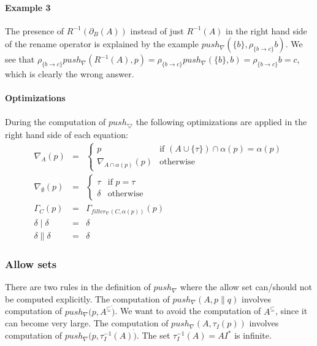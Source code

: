 \documentclass{article}
\begin{document}
\paragraph{Example 3}

The presence of $R^{-1}(\partial _{B}(A))$ instead of just $R^{-1}(A)$ in
the right hand side of the rename operator is explained by the example $%
push_{\nabla }(\{b\},\rho _{\{b\rightarrow c\}}b)$. We see that $\rho
_{\{b\rightarrow c\}}push_{\nabla }(R^{-1}(A),p)=\rho _{\{b\rightarrow
c\}}push_{\nabla }(\{b\},b)=\rho _{\{b\rightarrow c\}}b=c$, which is clearly
the wrong answer.

\paragraph{Optimizations}

During the computation of $push_{\bigtriangledown }$ the following
optimizations are applied in the right hand side of each equation:%
\[
\begin{array}{lll}
\nabla _{A}(p) & = & \left\{ 
\begin{array}{ll}
p & \text{if }(A\cup \{\tau \})\cap \alpha (p)=\alpha (p) \\ 
\nabla _{A\cap \alpha (p)}(p) & \text{otherwise}%
\end{array}%
\right. \\ 
\nabla _{\emptyset }(p) & = & \left\{ 
\begin{array}{ll}
\tau & \text{if }p=\tau \\ 
\delta & \text{otherwise}%
\end{array}%
\right. \\ 
\Gamma _{C}(p) & = & \Gamma _{filter_{\nabla }(C,\alpha (p))}(p) \\ 
\delta \mid \delta & = & \delta \\ 
\delta \parallel \delta & = & \delta%
\end{array}%
\]

\subsubsection{Allow sets}

There are two rules in the definition of $push_{\nabla }$ where the allow
set can/should not be computed explicitly. The computation of $push_{\nabla
}(A,p\parallel q)$ involves computation of $push_{\nabla }(p,A^{\subseteq }%
\dot{)}$. We want to avoid the computation of $A^{\subseteq }$, since it can
become very large. The computation of $push_{\nabla }(A,\tau _{I}(p))$
involves computation of $push_{\nabla }(p,\tau _{I}^{-1}(A)\dot{)}$. The set 
$\tau _{I}^{-1}(A)=AI^{\ast }$ is infinite.
\end{document}
